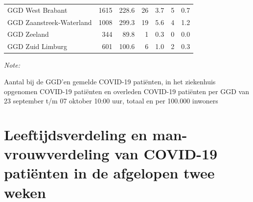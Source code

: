 \documentclass[
  english,
  man,floatsintext]{apa6}
\begin{document}
\begin{table}[H]
\begin{threeparttable}
\begin{tabular}{lrrrrrr}
GGD West Brabant & 1615 & 228.6 & 26 & 3.7 & 5 & 0.7\\
GGD Zaanstreek-Waterland & 1008 & 299.3 & 19 & 5.6 & 4 & 1.2\\
GGD Zeeland & 344 & 89.8 & 1 & 0.3 & 0 & 0.0\\
GGD Zuid Limburg & 601 & 100.6 & 6 & 1.0 & 2 & 0.3\\
\bottomrule
\end{tabular}
\begin{tablenotes}
\item \textit{Note: } 
\item Aantal bij de GGD’en gemelde COVID-19 patiënten, in het ziekenhuis opgenomen COVID-19 patiënten en overleden COVID-19 patiënten per GGD van 23 september t/m 07 oktober 10:00 uur, totaal en per 100.000 inwoners
\end{tablenotes}
\end{threeparttable}
\endgroup{}
\end{table}

\newpage

\hypertarget{leeftijdsverdeling-en-man-vrouwverdeling-van-covid-19-patiuxebnten-in-de-afgelopen-twee-weken}{%
\section{Leeftijdsverdeling en man-vrouwverdeling van COVID-19 patiënten in de afgelopen twee weken}\label{leeftijdsverdeling-en-man-vrouwverdeling-van-covid-19-patiuxebnten-in-de-afgelopen-twee-weken}}
\end{document}
